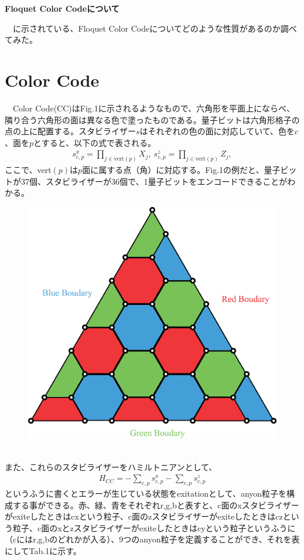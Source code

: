 \documentclass[a4paper,9pt]{ltjsarticle}
\begin{document}
\centerline{\Large\bfseries Floquet Color Codeについて}
\vspace{10pt}
　\cite{kesselring2024}に示されている、Floquet Color Codeについてどのような性質があるのか調べてみた。
\section{Color Code}
  　Color Code(CC)はFig.1に示されるようなもので、六角形を平面上にならべ、隣り合う六角形の面は異なる色で塗ったものである。量子ビットは六角形格子の点の上に配置する。スタビライザー$s$はそれぞれの色の面に対応していて、色を$c$、面を$p$とすると、以下の式で表される。
  \begin{align}
    s_{c,p}^x=\prod_{j\in\mathrm{vert}(p)}X_j,\  s_{c,p}^z=\prod_{j\in\mathrm{vert}(p)}Z_j,
  \end{align}
  ここで、vert$(p)$は$p$面に属する点（角）に対応する。Fig.1の例だと、量子ビットが37個、スタビライザーが36個で、1量子ビットをエンコードできることがわかる。
  \begin{figure}[h]
    \centering
    \includegraphics[scale=0.20]{figure/figure1.eps}
    \vspace{-5pt}\caption{}
    \label{figure1}
    \vspace{-15pt}
  \end{figure}\\
  また、これらのスタビライザーをハミルトニアンとして、
  \begin{align}
    H_{CC}=-\sum_{c,p}s_{c,p}^x-\sum_{c,p}s_{c,p}^z
  \end{align}
  というふうに書くとエラーが生じている状態をexitationとして、anyon粒子を構成する事ができる。赤、緑、青をそれぞれr,g,bと表すと、c面のxスタビライザーがexiteしたときはcxという粒子、c面のzスタビライザーがexiteしたときはczという粒子、c面のxとzスタビライザーがexiteしたときはcyという粒子というふうに（cにはr,g,bのどれかが入る）、9つのanyon粒子を定義することができ、それを表にしてTab.1に示す。\\
    
\end{document}
